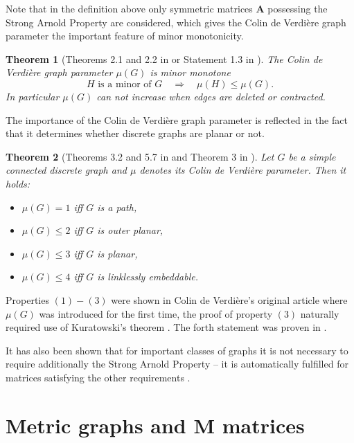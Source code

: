 \documentclass{amsart}
\newtheorem{theorem}{Theorem}[section]
\theoremstyle{definition}
\theoremstyle{remark}
\numberwithin{equation}{section}
\begin{document}
Note that in the definition above only symmetric matrices $ \mathbf{A} $ possessing the Strong Arnold Property are considered, which
 gives the Colin de Verdi{\`e}re graph parameter the important feature of minor monotonicity.

\begin{theorem}[Theorems 2.1 and 2.2 in \cite{YC90} or Statement 1.3 in \cite{HV99}]
The Colin de Verdi{\`e}re graph parameter $ \mu (G) $ is minor monotone
$$ \mbox{$H$ is a minor of $G$} \quad \Rightarrow \quad \mu(H) \leq \mu(G). $$
In particular $ \mu(G)$ can not increase when edges are deleted or contracted.
\end{theorem}

The importance of the Colin de Verdi{\`e}re graph parameter is reflected in the fact that  it  determines whether discrete graphs are planar or not.

\begin{theorem}[Theorems 3.2 and 5.7 in \cite{YC90} and Theorem 3 in \cite{LL98}] \label{ThCdV}
Let $ G $ be a simple connected discrete graph and $ \mu $ denotes its Colin de Verdi{\`e}re parameter. Then it holds:
\begin{itemize}
\item $\mu(G)=1$ iff $G$ is a path,
\item $\mu(G)\leq 2$ iff $G$ is outer planar,
\item $\mu(G)\leq  3$ iff $G$ is planar,
\item $\mu(G)\leq  4$ iff $G$ is linklessly embeddable.
\end{itemize}

\end{theorem}
Properties $(1)-(3)$ were shown in Colin de Verdi\`ere's original article \cite{YC90} where  $\mu(G)$ was introduced for the first time,
the proof of
property $(3)$ naturally required use of Kuratowski's theorem \cite{Kuratowski}. The forth statement was proven in \cite{LL98}.

It has also been shown that for important classes of graphs it is not necessary to require additionally  the Strong Arnold Property
-- it is automatically fulfilled for matrices satisfying the other requirements \cite{vdH10,AS17}. 

\section{Metric graphs and M matrices} \label{Sec3}
\end{document}
